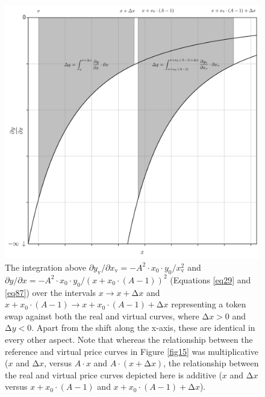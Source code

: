 \documentclass{article}
\begin{document}
\begin{figure}[ht]
    \centering
    \includegraphics[width=\textwidth]{fig21.png}
    \captionsetup{
        justification=raggedright,
        singlelinecheck=false,
        font=small,
        labelfont=bf,
        labelsep=quad,
        format=plain
    }
    \caption{The integration above $\partial y_{\text{v}} / \partial x_{\text{v}} = - A^{2} \cdot x_{0} \cdot y_{0} / x_{\text{v}}^{2}$ and $\partial y / \partial x = - A^{2} \cdot x_{0} \cdot y_{0} / \left(x + x_{0} \cdot \left( A - 1 \right) \right)^{2}$ (Equations \ref{eq29} and \ref{eq87}) over the intervals $x \rightarrow x + \mathrm{\Delta}x$ and $x + x_{0} \cdot \left( A - 1 \right) \rightarrow x + x_{0} \cdot \left( A - 1 \right) + \mathrm{\Delta}x$ representing a token swap against both the real and virtual curves, where $\mathrm{\Delta}x > 0$ and $\mathrm{\Delta}y < 0$. Apart from the shift along the x-axis, these are identical in every other aspect. Note that whereas the relationship between the reference and virtual price curves in Figure \ref{fig15} was multiplicative ($x$ and $\mathrm{\Delta}x$, versus $A \cdot x$ and $A \cdot \left( x + \mathrm{\Delta}x\right)$, the relationship between the real and virtual price curves depicted here is additive ($x$ and $\mathrm{\Delta}x$ versus $x + x_{0} \cdot \left( A - 1 \right)$ and $x + x_{0} \cdot \left( A - 1 \right) + \mathrm{\Delta}x$).}
    \label{fig21}
\end{figure}
\end{document}

